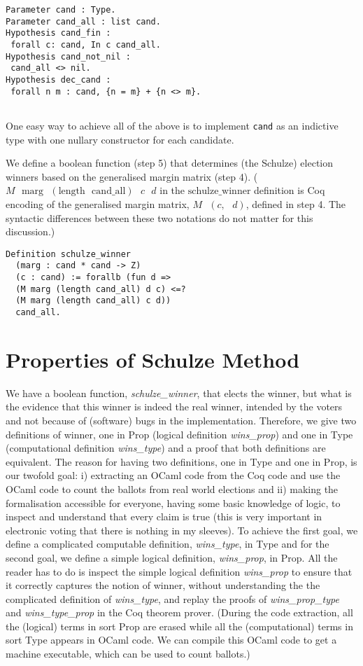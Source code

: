 \documentclass[compsoc,conference,a4paper,10pt,times]{IEEEtran}
\begin{document}
 \begin{verbatim}
Parameter cand : Type.
Parameter cand_all : list cand.
Hypothesis cand_fin : 
 forall c: cand, In c cand_all.
Hypothesis cand_not_nil : 
 cand_all <> nil.
Hypothesis dec_cand : 
 forall n m : cand, {n = m} + {n <> m}.


\end{verbatim}

One easy way to achieve all of the above is to implement
\texttt{cand} as an indictive type with one nullary constructor for
each candidate.


We define a boolean function (step 5) that determines 
(the Schulze) election winners based on 
the generalised margin matrix (step 4). ($M \text{ } \mathrm{marg} \text{ } 
(\mathrm{length} \text{ } \mathrm{cand\_all}) \text{ } c \text{ } d$
in the $\mathrm{schulze\_winner}$ definition is Coq encoding of the 
generalised margin matrix, 
$M \text{ } (c, \text{ }d)$, defined in step 4. The syntactic differences between these 
two notations do not matter  for this discussion.)
 \begin{verbatim}
Definition schulze_winner 
  (marg : cand * cand -> Z) 
  (c : cand) := forallb (fun d => 
  (M marg (length cand_all) d c) <=? 
  (M marg (length cand_all) c d))
  cand_all.
\end{verbatim}


\section{Properties of Schulze Method}
We have a boolean function,  \textit{schulze\_winner},  that 
elects the winner, but what is the evidence that 
this winner is indeed the real winner,  intended by the voters and 
not because of (software) bugs in the implementation. 
Therefore,  we give two definitions \cite{Pattinson:2017:SVE} of 
winner, one in Prop (logical definition \textit{wins\_prop}) 
and one in Type (computational definition \textit{wins\_type}) 
and a proof that both definitions are equivalent. The reason 
for having two definitions, one in Type and one in Prop, 
is our twofold goal: 
i) extracting an OCaml 
code from the Coq code and use the OCaml code 
to count the ballots from real world elections and ii)
making the formalisation accessible for everyone, having some basic
knowledge of logic, to inspect and understand that every claim 
is true (this is very important in electronic voting that 
there is nothing in my sleeves). To achieve the 
first goal, we define a complicated computable definition, 
\textit{wins\_type}, in Type 
and for the second goal, we define a simple logical definition,
\textit{wins\_prop}, in Prop. 
All the reader has to do is inspect the simple logical definition 
\textit{wins\_prop} to ensure that it correctly captures the notion 
of winner,  without understanding the the complicated
definition of \textit{wins\_type}, and replay the proofs of 
\textit{wins\_prop\_type} and \textit{wins\_type\_prop} in the Coq theorem prover. 
(During the code extraction, all the (logical) terms in sort Prop are erased while 
all the (computational) terms 
in sort Type appears in OCaml code. We can compile this OCaml code to get 
a machine executable, which can be used to count ballots.) 
\end{document}
